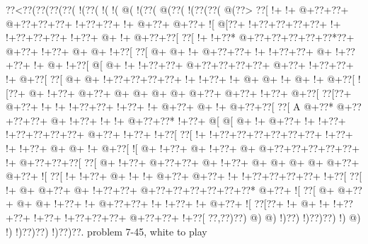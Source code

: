 \vbox{\vbox{\goo
\0??<\0??(\0??(\0??(\0??(\- !(\0??(\- !(\- !(\- @(\- !(\0??(\- @(\0??(\- !(\0??(\0??(\- @(\0??>
\0??[\- !+\- !+\- @+\0??+\0??+\- @+\0??+\0??+\0??+\- !+\0??+\0??+\- !+\- @+\0??+\- @+\0??+\- ![
\- @[\0??+\- !+\0??+\0??+\0??+\0??+\- !+\- !+\0??+\0??+\0??+\- !+\0??+\- @+\- !+\- @+\0??+\0??[
\0??[\- !+\- !+\0??*\- @+\0??+\0??+\0??+\0??+\0??*\0??+\- @+\0??+\- !+\0??+\- @+\- @+\- !+\0??[
\0??[\- @+\- @+\- !+\- @+\0??+\0??+\- !+\- !+\0??+\0??+\- @+\- !+\0??+\0??+\- !+\- @+\- !+\0??[
\- @[\- @+\- !+\- !+\0??+\0??+\- @+\0??+\0??+\0??+\0??+\- @+\0??+\- !+\0??+\0??+\- !+\- @+\0??[
\0??[\- @+\- @+\- !+\0??+\0??+\0??+\0??+\- !+\- !+\0??+\- !+\- @+\- @+\- !+\- @+\- !+\- @+\0??[
\- ![\0??+\- @+\- !+\0??+\- @+\0??+\- @+\- @+\- @+\- @+\- @+\0??+\- @+\0??+\- !+\0??+\- @+\0??[
\0??[\0??+\- @+\0??+\- !+\- !+\- !+\0??+\0??+\- !+\0??+\- !+\- @+\0??+\- @+\- !+\- @+\0??+\0??[
\0??[\!  A\- @+\0??*\- @+\0??+\0??+\0??+\- @+\- !+\0??+\- !+\- !+\- @+\0??+\0??*\- !+\0??+\- @[
\- @[\- @+\- !+\- @+\0??+\- !+\- !+\0??+\- !+\0??+\0??+\0??+\0??+\- @+\0??+\- !+\0??+\- !+\0??[
\0??[\- !+\- !+\0??+\0??+\0??+\0??+\0??+\0??+\- !+\0??+\- !+\- !+\0??+\- @+\- @+\- !+\- @+\0??[
\- ![\- @+\- !+\0??+\- @+\- !+\0??+\- @+\- @+\0??+\0??+\0??+\0??+\0??+\- !+\- @+\0??+\0??+\0??[
\0??[\- @+\- !+\0??+\- @+\0??+\0??+\- @+\- !+\0??+\- @+\- @+\- @+\- @+\- @+\0??+\- @+\0??+\- ![
\0??[\- !+\- !+\0??+\- @+\- !+\- !+\- @+\0??+\- @+\0??+\- !+\- !+\0??+\0??+\0??+\0??+\- !+\0??[
\0??[\- !+\- @+\- @+\0??+\- @+\- !+\0??+\0??+\- @+\0??+\0??+\0??+\0??+\0??+\0??*\- @+\0??+\- ![
\0??[\- @+\- @+\0??+\- @+\- @+\- !+\0??+\- !+\- @+\0??+\0??+\- !+\- !+\0??+\- !+\- @+\0??+\- ![
\0??[\0??+\- !+\- @+\- !+\- !+\0??+\0??+\- !+\0??+\- !+\0??+\0??+\0??+\- @+\0??+\0??+\- !+\0??[
\0??,\0??)\0??)\- @)\- @)\- !)\0??)\- !)\0??)\0??)\- !)\- @)\- !)\- !)\0??)\0??)\- !)\0??)\0??.
}
\hfil problem 7-45, white to play\hfil\break
}

